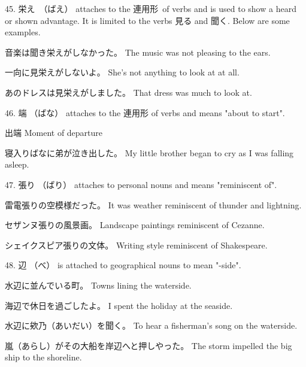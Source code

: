 \par{45. 栄え　（ばえ） attaches to the 連用形 of verbs and is used to show a heard or shown advantage. It is limited to the verbs 見る and 聞く. Below are some examples. }

\par{音楽は聞き栄えがしなかった。 \hfill\break
The music was not pleasing to the ears. }

\par{一向に見栄えがしないよ。 \hfill\break
She's not anything to look at at all. }

\par{あのドレスは見栄えがしました。 \hfill\break
That dress was much to look at. }

\par{46. 端 （ばな） attaches to the 連用形 of verbs and means "about to start". }

\par{出端 \hfill\break
Moment of departure }

\par{寝入りばなに弟が泣き出した。 \hfill\break
My little brother began to cry as I was falling asleep. }

\par{47. 張り （ばり） attaches to personal nouns and means "reminiscent of". }

\par{雷電張りの空模様だった。 \hfill\break
It was weather reminiscent of thunder and lightning. }

\par{セザンヌ張りの風景画。 \hfill\break
Landscape paintings reminiscent of Cezanne. }

\par{シェイクスピア張りの文体。 \hfill\break
Writing style reminiscent of Shakespeare. }

\par{48. 辺 （べ） is attached to geographical nouns to mean "-side". }

\par{水辺に並んでいる町。 \hfill\break
Towns lining the waterside. }

\par{海辺で休日を過ごしたよ。 \hfill\break
I spent the holiday at the seaside. }

\par{水辺に欸乃（あいだい）を聞く。 \hfill\break
To hear a fisherman's song on the waterside. }

\par{嵐（あらし）がその大船を岸辺へと押しやった。 \hfill\break
The storm impelled the big ship to the shoreline. }

